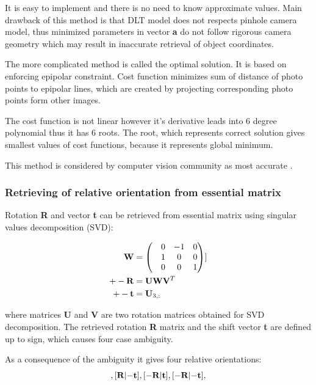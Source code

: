 \documentclass[a4paper,12pt]{article}
\newcommand{\ematr}[1]{
{\bf #1}
}
\newcommand{\evect}[1]{
{\bf #1}
}
\begin{document}
It is easy to implement and 
there is no need to know approximate values. 
Main drawback of this method is that DLT model does not respects pinhole camera model, thus
minimized parameters in vector \evect{a} do not follow rigorous camera geometry which 
may result in inaccurate retrieval of object coordinates.

The more complicated method is called the optimal solution. 
It is based on enforcing epipolar constraint.  Cost function 
minimizes sum of distance of photo points to epipolar lines, which are created 
by projecting corresponding photo points form other images.

The cost function is not linear however it's derivative leads into 6 degree polynomial thus 
it has 6 roots. The root, which represents correct solution gives smallest values of cost functions, 
because it represents global minimum. 

This method is considered by computer vision community as most accurate \cite[p. 315]{Hartley2004}.  

\subsubsection{Retrieving of relative orientation from essential matrix}
\label{sec:ess_eo}


Rotation \ematr{R} and vector \evect{t} can be retrieved from essential matrix using 
singular values decomposition (SVD):

\begin{equation}
\begin{split}
\ematr{W} &=
\begin{pmatrix}
& 0 & -1 & 0 \\
& 1 & 0 & 0 \\
& 0 & 0 & 1\\
\end{pmatrix}] \\
+- \ematr{R} &= \ematr{U}  \ematr{W} \ematr{V}^{T}\\
+- \evect{t} &= \evect{U}_{3,:}
\end{split}
\end{equation}

where matrices \ematr{U} and \ematr{V} are two rotation matrices  obtained for SVD decomposition.
The retrieved rotation \ematr{R} matrix and the shift vector \evect{t} are defined up to sign,
which causes four case ambiguity. 

As a consequence of the  ambiguity it gives four relative orientations: 
\begin{equation}
[\ematr{R}|\evect{t}],
[\ematr{R}|\evect{-t}],
[\ematr{-R}|\evect{t}],
[\ematr{-R}|\evect{-t}],
\end{equation}
\end{document}
